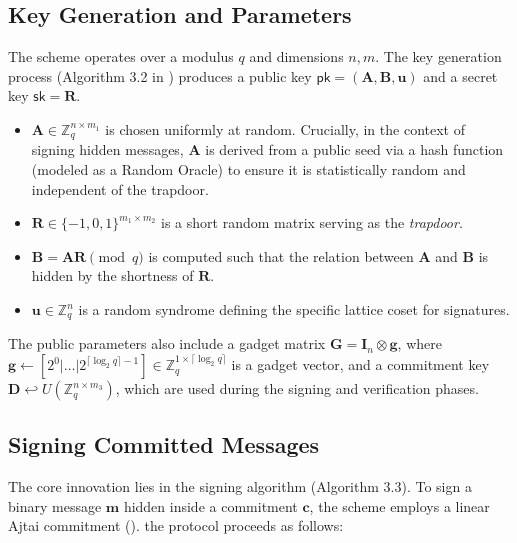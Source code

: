 \documentclass[a4paper]{article}
\newcommand{\pk}{\mathsf{pk}}
\newcommand{\sk}{\mathsf{sk}}
\begin{document}
\subsection{Key Generation and Parameters}
The scheme operates over a modulus $q$ and dimensions $n, m$. The key generation process (Algorithm 3.2 in
\cite{mainPaper}) produces a public key $\pk = (\mathbf{A}, \mathbf{B}, \mathbf{u})$ and a secret key $\sk = \mathbf{R}$.
\begin{itemize}
    \item $\mathbf{A} \in \mathbb{Z}_q^{n \times m_1}$ is chosen uniformly at random. Crucially, in the context of signing
          hidden messages, $\mathbf{A}$ is derived from a public seed via a hash function (modeled as a Random Oracle) to ensure it is statistically random and independent of the trapdoor.
    \item $\mathbf{R} \in \{-1, 0, 1\}^{m_1 \times m_2}$ is a short random matrix serving as the \textit{trapdoor}.
    \item $\mathbf{B} = \mathbf{A}\mathbf{R} \pmod q$ is computed such that the relation between $\mathbf{A}$ and
          $\mathbf{B}$ is hidden by the shortness of $\mathbf{R}$.
    \item $\mathbf{u} \in \mathbb{Z}_q^n$ is a random syndrome defining the specific lattice coset for signatures.
\end{itemize}
The public parameters also include a gadget matrix $\mathbf{G} = \mathbf{I}_n \otimes \mathbf{g}$, where $\mathbf{g} \leftarrow [2^0 \vert \dots \vert 2^{\lceil \log_2 q \rceil - 1}] \in \mathbb{Z}_q^{1\times \lceil \log_2 q \rceil}$ 
is a gadget vector, and a commitment key $\mathbf{D} \hookleftarrow U(\mathbb{Z}_q^{n\times m_3})$, which are used during
the signing and verification phases.

\subsection{Signing Committed Messages}
The core innovation lies in the signing algorithm (Algorithm 3.3). To sign a binary message $\mathbf{m}$ hidden inside a
commitment $\mathbf{c}$, the scheme employs a linear Ajtai commitment (\cite{AjtaiM}). the protocol proceeds as follows:
\end{document}
